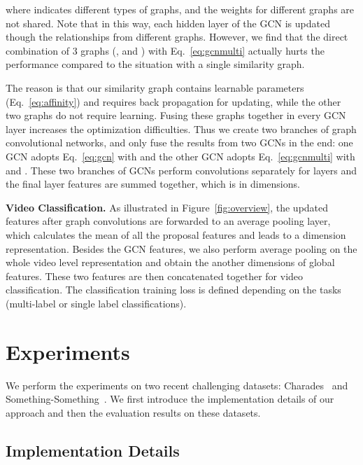 \documentclass[runningheads]{llncs}
\begin{document}
where  indicates different types of graphs, and the weights for different graphs  are not shared. Note that in this way, each hidden layer of the GCN is updated though the relationships from different graphs. However, we find that the direct combination of 3 graphs (,  and ) with Eq.~\ref{eq:gcnmulti} actually hurts the performance compared to the situation with a single similarity graph. 

The reason is that our similarity graph  contains learnable parameters (Eq.~\ref{eq:affinity}) and requires back propagation for updating, while the other two graphs do not require learning. Fusing these graphs together in every GCN layer increases the optimization difficulties. Thus we create two branches of graph convolutional networks, and only fuse the results from two GCNs in the end: one GCN adopts Eq.~\ref{eq:gcn} with  and the other GCN adopts Eq.~\ref{eq:gcnmulti} with  and . These two branches of GCNs perform convolutions separately for  layers and the final layer features are summed together, which is in  dimensions. 

\textbf{Video Classification.} As illustrated in Figure~\ref{fig:overview}, the updated features after graph convolutions are forwarded to an average pooling layer, which calculates the mean of all the proposal features and leads to a  dimension representation. Besides the GCN features, we also perform average pooling on the whole video level representation and obtain the another  dimensions of global features. These two features are then concatenated together for video classification. The classification training loss is defined depending on the tasks (multi-label or single label classifications). 


\vspace{-0.05in}
\section{Experiments}
We perform the experiments on two recent challenging datasets: Charades~\cite{Sigurdsson2016} and Something-Something~\cite{20bnsthsth}. We first introduce the implementation details of our approach and then the evaluation results on these datasets. 



\vspace{-0.1in}
\subsection{Implementation Details} 
\vspace{-0.05in}
\end{document}
